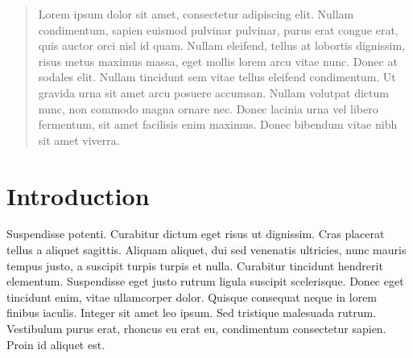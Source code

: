 \documentclass{article}
\theoremstyle{plain}
\theoremstyle{definition}
\theoremstyle{remark}
\begin{document}
\printAffiliationsAndNotice{\icmlEqualContribution} %


\begin{abstract}

Lorem ipsum dolor sit amet, consectetur adipiscing elit. Nullam condimentum, sapien euismod pulvinar pulvinar, purus erat congue erat, quis auctor orci nisl id quam. Nullam eleifend, tellus at lobortis dignissim, risus metus maximus massa, eget mollis lorem arcu vitae nunc. Donec at sodales elit. Nullam tincidunt sem vitae tellus eleifend condimentum. Ut gravida urna sit amet arcu posuere accumsan. Nullam volutpat dictum nunc, non commodo magna ornare nec. Donec lacinia urna vel libero fermentum, sit amet facilisis enim maximus. Donec bibendum vitae nibh sit amet viverra.
\end{abstract}


\section{Introduction}\label{sec:intro}


Suspendisse potenti. Curabitur dictum eget risus ut dignissim. Cras placerat tellus a aliquet sagittis. Aliquam aliquet, dui sed venenatis ultricies, nunc mauris tempus justo, a suscipit turpis turpis et nulla. Curabitur tincidunt hendrerit elementum. Suspendisse eget justo rutrum ligula suscipit scelerisque. Donec eget tincidunt enim, vitae ullamcorper dolor. Quisque consequat neque in lorem finibus iaculis. Integer sit amet leo ipsum. Sed tristique malesuada rutrum. Vestibulum purus erat, rhoncus eu erat eu, condimentum consectetur sapien. Proin id aliquet est.

\end{document}
